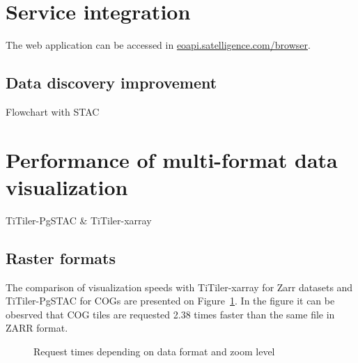 \documentclass[
  oneside,
  open=any]{scrbook}
\begin{document}
\section{Service integration}\label{service-integration}

The web application can be accessed in
\href{https://eoapi.satelligence.com/browser/?.language=en}{eoapi.satelligence.com/browser}.

\subsection{Data discovery
improvement}\label{data-discovery-improvement}

Flowchart with STAC

\section{Performance of multi-format data
visualization}\label{performance-of-multi-format-data-visualization}

TiTiler-PgSTAC \& TiTiler-xarray

\subsection{Raster formats}\label{raster-formats}

The comparison of visualization speeds with TiTiler-xarray for Zarr
datasets and TiTiler-PgSTAC for COGs are presented on
Figure~\ref{fig-format-comp}. In the figure it can be obesrved that COG
tiles are requested 2.38 times faster than the same file in ZARR format.

\begin{figure}[H]


\caption{\label{fig-format-comp}Request times depending on data format
and zoom level}

\end{figure}%
\end{document}
